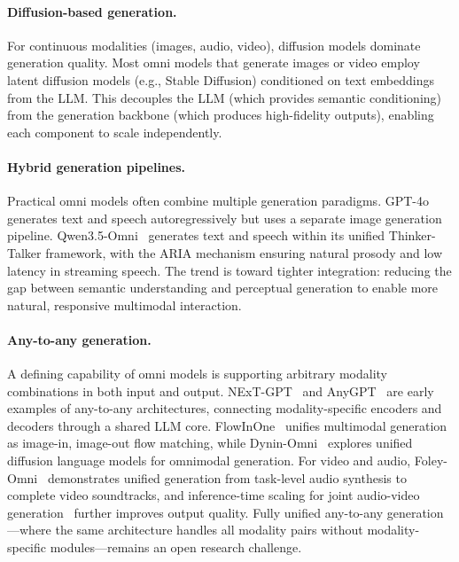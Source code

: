 \documentclass{article}
\begin{document}
\paragraph{Diffusion-based generation.}
For continuous modalities (images, audio, video), diffusion models dominate generation quality.
Most omni models that generate images or video employ latent diffusion models (e.g., Stable Diffusion) conditioned on text embeddings from the LLM.
This decouples the LLM (which provides semantic conditioning) from the generation backbone (which produces high-fidelity outputs), enabling each component to scale independently.

\paragraph{Hybrid generation pipelines.}
Practical omni models often combine multiple generation paradigms.
GPT-4o generates text and speech autoregressively but uses a separate image generation pipeline.
Qwen3.5-Omni~\cite{qwen2026omni} generates text and speech within its unified Thinker-Talker framework, with the ARIA mechanism ensuring natural prosody and low latency in streaming speech.
The trend is toward tighter integration: reducing the gap between semantic understanding and perceptual generation to enable more natural, responsive multimodal interaction.

\paragraph{Any-to-any generation.}
A defining capability of omni models is supporting arbitrary modality combinations in both input and output.
NExT-GPT~\cite{wu2024nextgpt} and AnyGPT~\cite{zhan2024anygpt} are early examples of any-to-any architectures, connecting modality-specific encoders and decoders through a shared LLM core.
FlowInOne~\cite{placeholder2026flowinone} unifies multimodal generation as image-in, image-out flow matching, while Dynin-Omni~\cite{placeholder2026dyninomni} explores unified diffusion language models for omnimodal generation.
For video and audio, Foley-Omni~\cite{placeholder2026foleyomni} demonstrates unified generation from task-level audio synthesis to complete video soundtracks, and inference-time scaling for joint audio-video generation~\cite{placeholder2026infertimescale} further improves output quality.
Fully unified any-to-any generation---where the same architecture handles all modality pairs without modality-specific modules---remains an open research challenge.
\end{document}
